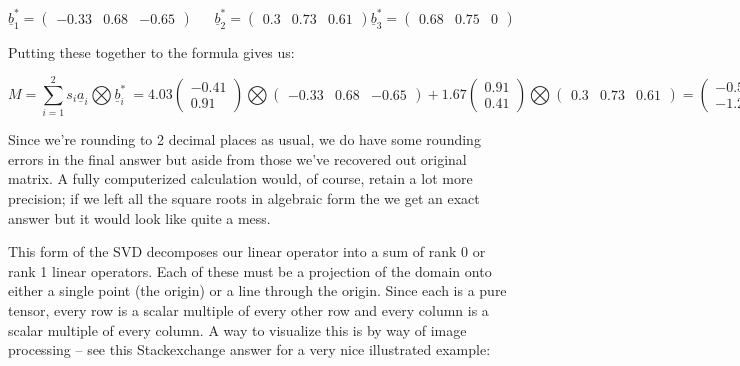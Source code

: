 \documentclass[oneside,english]{amsbook}
\numberwithin{section}{chapter}
\theoremstyle{plain}
\theoremstyle{definition}
\begin{document}
\[{{\underline{b}}_{1}^{*} = \begin{pmatrix}
		- 0.33 & 0.68 & - 0.65
	\end{pmatrix}\ \ \ \ \ \ \ 
}{{\underline{b}}_{2}^{*} = \begin{pmatrix}
		0.3 & 0.73 & 0.61
	\end{pmatrix}
}{{\underline{b}}_{3}^{*} = \begin{pmatrix}
		0.68 & 0.75 & 0
\end{pmatrix}}\]

Putting these together to the formula gives us:

\[{M = \sum_{i = 1}^{2}{s_{i}{\underline{a}}_{i}\bigotimes{\underline{b}}_{i}^{*}}\ 
}{= 4.03\begin{pmatrix}
		- 0.41 \\
		0.91
	\end{pmatrix}\bigotimes\begin{pmatrix}
		- 0.33 & 0.68 & - 0.65
	\end{pmatrix} + 1.67\begin{pmatrix}
		0.91 \\
		0.41
	\end{pmatrix}\bigotimes\begin{pmatrix}
		0.3 & 0.73 & 0.61
	\end{pmatrix}
}{= \begin{pmatrix}
		- 0.54 & - 1.12 & 1.07 \\
		- 1.21 & 2.49 & - 2.38
	\end{pmatrix} + \begin{pmatrix}
		0.46 & 1.11 & 0.93 \\
		0.21 & 0.5 & 0.42
	\end{pmatrix}
}{= \begin{pmatrix}
		1 & - 0.01 & 2 \\
		- 1.01 & 2.99 & - 1.97
	\end{pmatrix}
}{\approx \begin{pmatrix}
		1 & 0 & 2 \\
		- 1 & 3 & - 2
\end{pmatrix}}\]

Since we're rounding to 2 decimal places as usual, we do have some
rounding errors in the final answer but aside from those we've recovered
out original matrix. A fully computerized calculation would, of course,
retain a lot more precision; if we left all the square roots in
algebraic form the we get an exact answer but it would look like quite a
mess.

This form of the SVD decomposes our linear operator into a sum of rank 0
or rank 1 linear operators. Each of these must be a projection of the
domain onto either a single point (the origin) or a line through the
origin. Since each is a pure tensor, every row is a scalar multiple of
every other row and every column is a scalar multiple of every column. A
way to visualize this is by way of image processing -- see this
Stackexchange answer for a very nice illustrated example:
\end{document}
